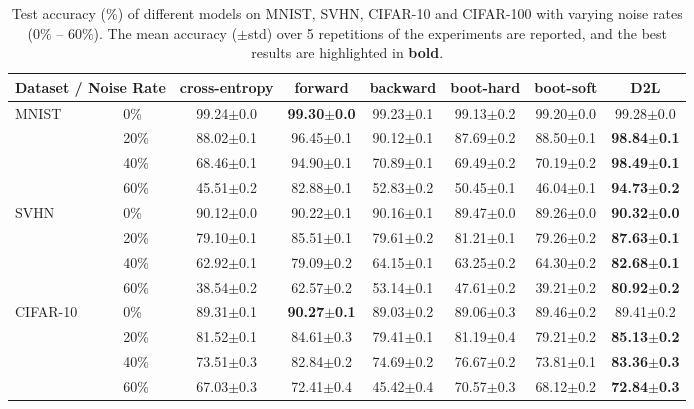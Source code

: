 \documentclass{article}
\begin{document}
\begin{table*}[!tb]
\renewcommand{\arraystretch}{1.1}
\centering
\small
\caption{Test accuracy (\%) of different models on MNIST, SVHN, CIFAR-10 and CIFAR-100 with varying noise rates ($0\%$ -- $60\%$). The mean accuracy ($\pm$std) over 5 repetitions of the experiments are reported, and the best results are highlighted in \textbf{bold}.}
\label{tb:experiment_sym}
\begin{tabular}{ll|cccccc}
\hline
\multicolumn{2}{c|}{Dataset / Noise Rate} & cross-entropy & forward & backward & boot-hard & boot-soft & D2L  \\ \hline
\multirow{4}{*}{MNIST} 
& 0\% & 99.24$\pm$0.0 & \textbf{99.30$\pm$0.0} & 99.23$\pm$0.1 & 99.13$\pm$0.2 & 99.20$\pm$0.0 & 99.28$\pm$0.0  \\
& 20\% & 88.02$\pm$0.1 & 96.45$\pm$0.1 & 90.12$\pm$0.1 & 87.69$\pm$0.2 & 88.50$\pm$0.1 & \textbf{98.84$\pm$0.1}  \\
& 40\% & 68.46$\pm$0.1  & 94.90$\pm$0.1 & 70.89$\pm$0.1  & 69.49$\pm$0.2 & 70.19$\pm$0.2 & \textbf{98.49$\pm$0.1}  \\
& 60\% & 45.51$\pm$0.2 & 82.88$\pm$0.1 & 52.83$\pm$0.2 & 50.45$\pm$0.1 & 46.04$\pm$0.1 & \textbf{94.73$\pm$0.2}  \\ \hline
\multirow{4}{*}{SVHN}
& 0\% & 90.12$\pm$0.0 & 90.22$\pm$0.1 & 90.16$\pm$0.1 & 89.47$\pm$0.0 & 89.26$\pm$0.0 & \textbf{90.32$\pm$0.0} \\
& 20\% & 79.10$\pm$0.1 & 85.51$\pm$0.1 & 79.61$\pm$0.2 & 81.21$\pm$0.1 & 79.26$\pm$0.2 & \textbf{87.63$\pm$0.1}  \\
& 40\% & 62.92$\pm$0.1  & 79.09$\pm$0.2 & 64.15$\pm$0.1 & 63.25$\pm$0.2 & 64.30$\pm$0.2 & \textbf{82.68$\pm$0.1}  \\
& 60\% & 38.54$\pm$0.2 & 62.57$\pm$0.2 & 53.14$\pm$0.1 & 47.61$\pm$0.2 & 39.21$\pm$0.2 & \textbf{80.92$\pm$0.2}  \\ \hline
\multirow{4}{*}{CIFAR-10}
& 0\% & 89.31$\pm$0.1 & \textbf{90.27$\pm$0.1} & 89.03$\pm$0.2 & 89.06$\pm$0.3 & 89.46$\pm$0.2 & 89.41$\pm$0.2  \\
& 20\% & 81.52$\pm$0.1  & 84.61$\pm$0.3 & 79.41$\pm$0.1 & 81.19$\pm$0.4 & 79.21$\pm$0.2 & \textbf{85.13$\pm$0.2}  \\
& 40\% & 73.51$\pm$0.3  & 82.84$\pm$0.2 & 74.69$\pm$0.2 & 76.67$\pm$0.2 & 73.81$\pm$0.1 & \textbf{83.36$\pm$0.3}  \\
& 60\% & 67.03$\pm$0.3  & 72.41$\pm$0.4 & 45.42$\pm$0.4 & 70.57$\pm$0.3 & 68.12$\pm$0.2 & \textbf{72.84$\pm$0.3}  \\

\end{tabular}
\end{table*}
\end{document}
